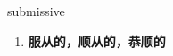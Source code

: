 
\begin{frame}
{\huge submissive}
\begin{center}
\begin{enumerate}\Large
  \item \textbf{服从的，顺从的，恭顺的}
\end{enumerate}
\end{center}
\end{frame}
